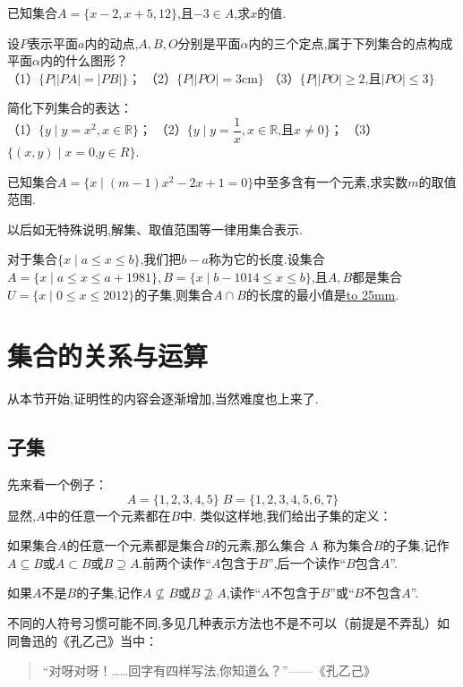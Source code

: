 \documentclass[lang=cn,math=cm,chinesefont=nofont,11pt,scheme=chinese,twocol]{elegantbook}
\begin{document}
\begin{exercise}\label{exer:6}
  已知集合$A=\{x-2,x+5,12\}$,且$-3\in A$,求$x$的值.
\end{exercise}

\begin{exercise}\label{exer:7}
  设$P$表示平面$a$内的动点,$A,B,O$分别是平面$\alpha$内的三个定点,属于下列集合的点构成平面$\alpha$内的什么图形？\\
  （1）$\{P||PA|=|PB|\}$；
  （2）$\{P||PO|=3\text{cm}\}$
  （3）$\{P||PO|\geqslant2\text{,且}|PO|\leqslant3\}$
\end{exercise}

\begin{exercise}\label{exer:8}
  简化下列集合的表达：\\
  （1）$\{y\mid y=x^2,x\in\mathbb{R}\}$；
  （2）$\{y\mid y=\dfrac{1}{x},x\in\mathbb{R}\text{,且}x\neq0\}$；
  （3）$\{(x,y)\mid x=0\text{,}y\in R\}$.
\end{exercise}

\begin{exercise}\label{exer:9}
  已知集合$A=\{x\mid(m-1)x^2-2x+1=0\}$中至多含有一个元素,求实数$m$的取值范围.
\end{exercise}
\begin{remark}
  以后如无特殊说明,解集、取值范围等一律用集合表示.
\end{remark}

\begin{exercise}\label{exer:202406261951}
  对于集合$\{x\mid a\leq x\leq b\}$,我们把$b-a$称为它的长度.设集合$A=\{x\mid a\leq x\leq a+1981\},B=\{x\mid b-1014\leq x\leq b\}$,且$A,B$都是集合$U=\{x\mid 0\leq x\leq 2012\}$的子集,则集合$A\cap B$的长度的最小值是\underline{\hbox to 25mm{}}.
\end{exercise}

\section{集合的关系与运算}
从本节开始,证明性的内容会逐渐增加,当然难度也上来了.
\subsection{子集}
先来看一个例子：$$A=\{1,2,3,4,5\}\;B=\{1,2,3,4,5,6,7\}$$
显然,$A$中的任意一个元素都在$B$中.
类似这样地,我们给出子集的定义：
\begin{definition}[子集]
  如果集合$A$的任意一个元素都是集合$B$的元素,那么集合 A 称为集合$B$的子集,记作$A\subseteq B$或$A\subset B$或$B\supseteq A$.前两个读作“$A$包含于$B$”,后一个读作“$B$包含$A$”.

  如果$A$不是$B$的子集,记作$A\nsubseteq B$或$B\nsupseteq A$,读作“$A$不包含于$B$”或“$B$不包含$A$”.
\end{definition}
不同的人符号习惯可能不同,多见几种表示方法也不是不可以（前提是不弄乱）如同鲁迅的《孔乙己》当中：
\begin{quotation}
  “对呀对呀！……回字有四样写法,你知道么？”——《孔乙己》
\end{quotation}
\end{document}
